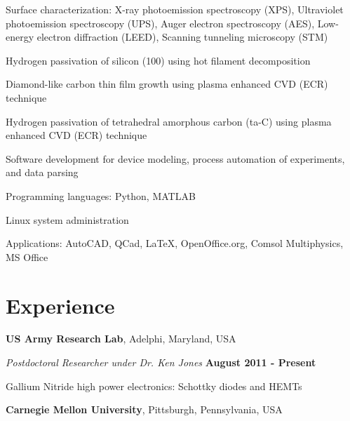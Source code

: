 \documentclass[letterpaper,margin,line]{res}
\newenvironment{list1}{
  \begin{list}{\ding{113}}{%
      \setlength{\itemsep}{0in}
      \setlength{\parsep}{0in} \setlength{\parskip}{0in}
      \setlength{\topsep}{0in} \setlength{\partopsep}{0in} 
      \setlength{\leftmargin}{0.17in}}}{\end{list}}
\begin{document}
\begin{resume}
\vspace*{-2.5mm}
Surface characterization: X-ray photoemission spectroscopy (XPS), Ultraviolet photoemission spectroscopy (UPS), Auger electron spectroscopy (AES), Low-energy electron diffraction (LEED), Scanning tunneling microscopy (STM)

\vspace*{-2.5mm}
Hydrogen passivation of silicon (100) using hot filament decomposition

\vspace*{-2.5mm}
Diamond-like carbon thin film growth using plasma enhanced CVD (ECR) technique

\vspace*{-2.5mm}
Hydrogen passivation of tetrahedral amorphous carbon (ta-C) using plasma enhanced CVD (ECR) technique

\vspace*{-2.5mm}
Software development for device modeling, process automation of experiments, and data parsing

\vspace*{-2.5mm}
Programming languages: Python, MATLAB

\vspace*{-2.5mm}
Linux system administration

\vspace*{-2.5mm}
Applications: AutoCAD, QCad, \LaTeX, OpenOffice.org, Comsol Multiphysics, MS Office

\section{\sc Experience}
{\bf US Army Research Lab}, Adelphi, Maryland, USA

\vspace{-.3cm}
{\em Postdoctoral Researcher under Dr. Ken Jones} \hfill {\bf August 2011 - Present}\\
\begin{list1}
\item[] Gallium Nitride high power electronics: Schottky diodes and HEMTs
\end{list1}



{\bf Carnegie Mellon University}, Pittsburgh, Pennsylvania, USA


\end{resume}
\end{document}
